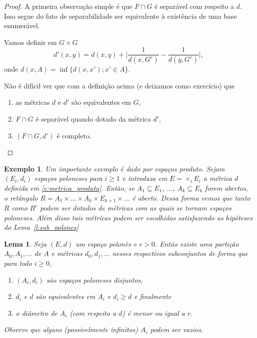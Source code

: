 \documentclass[reqno, final]{book}
\newcommand*\1{\mathds{1}}
\newtheorem{lemma}[theorem]{Lema}
\newtheorem{example}{Exemplo}[section]
\begin{document}
\begin{proof}
  A primeira observação simple é que $F \cap G$ é separável com respeito a $d$.
  Isso segue do fato de separabilidade ser equivalente à existência de uma base enumerável.

  Vamos definir em $G \times G$
  \begin{equation}
    d'(x,y) = d(x,y) + \Big| \frac{1}{d(x,G^c)} - \frac{1}{d(y,G^c)} \Big|,
  \end{equation}
  onde $d(x,A) = \inf\{d(x,x'); x' \in A\}$.

  Não é difícil ver que com a definição acima (e deixamos como exercício) que
  \begin{enumerate}[\quad a)]
  \item as métricas $d$ e $d'$ são equivalentes em $G$,
  \item $F \cap G$ é separável quando dotado da métrica $d'$,
  \item $(F \cap G, d')$ é completo.
  \end{enumerate}
\end{proof}


\begin{example}
  Um importante exemplo é dado por espaços produto.
  Sejam $(E_i, d_i)$ espaços poloneses para $i \geq 1$ e introduza em $E = \times_i E_i$ a métrica $d$ definida em \eqref{e:metrica_produto}.
  Então, se $A_1 \subseteq E_1$, $\dots$, $A_k \subseteq E_k$ forem abertos, o retângulo $R = A_1 \times \dots \times A_k \times E_{k+1} \times \dots$ é aberto.
  Dessa forma vemos que tanto $R$ como $R^c$ podem ser dotados de métricas com as quais se tornam espaços poloneses.
  Além disso tais métricas podem ser escolhidas satisfazendo as hipóteses do Lema~\ref{l:sub_polones}
\end{example}

\begin{lemma}
  \label{l:particao_polones}
  Seja $(E, d)$ um espaço polonês e $r > 0$.
  Então existe uma partição $A_0, A_1, \dots$ de $A$ e métricas $d_0, d_1, \dots$ nesses respectivos subconjuntos de forma que para todo $i \geq 0$,
  \begin{enumerate}[\quad a)]
  \item $(A_i, d_i)$ são espaços poloneses disjuntos,
  \item $d_i$ e $d$ são equivalentes em $A_i$ e $d_i \geq d$ e finalmente
  \item o diâmetro de $A_i$ (com respeito a $d$) é menor ou igual a $r$.
  \end{enumerate}
  Observe que alguns (possivelmente infinitos) $A_i$ podem ser vazios.
\end{lemma}
\end{document}
